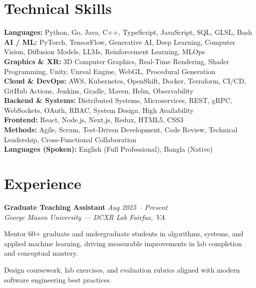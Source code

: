 \documentclass[letterpaper,10pt]{article}
\newcommand{\role}[4]{%
  \textbf{#1} \hfill \textit{#3}\\[-1pt]
  \textit{#2} \hfill \textit{#4}\par\vspace{2pt}
}
\begin{document}
\section*{Technical Skills}
\textbf{Languages:} Python, Go, Java, C++, TypeScript, JavaScript, SQL, GLSL, Bash\\
\textbf{AI / ML:} PyTorch, TensorFlow, Generative AI, Deep Learning, Computer Vision, Diffusion Models, LLMs, Reinforcement Learning, MLOps\\
\textbf{Graphics \& XR:} 3D Computer Graphics, Real-Time Rendering, Shader Programming, Unity, Unreal Engine, WebGL, Procedural Generation\\
\textbf{Cloud \& DevOps:} AWS, Kubernetes, OpenShift, Docker, Terraform, CI/CD, GitHub Actions, Jenkins, Gradle, Maven, Helm, Observability\\
\textbf{Backend \& Systems:} Distributed Systems, Microservices, REST, gRPC, WebSockets, OAuth, RBAC, System Design, High Availability\\
\textbf{Frontend:} React, Node.js, Next.js, Redux, HTML5, CSS3\\
\textbf{Methods:} Agile, Scrum, Test-Driven Development, Code Review, Technical Leadership, Cross-Functional Collaboration\\
\textbf{Languages (Spoken):} English (Full Professional), Bangla (Native)

\section*{Experience}

\role{Graduate Teaching Assistant}{George Mason University --- DCXR Lab}{Aug 2025 -- Present}{Fairfax, VA}
\begin{tightitemize}
  \item Mentor 60+ graduate and undergraduate students in algorithms, systems, and applied machine learning, driving measurable improvements in lab completion and conceptual mastery.
  \item Design coursework, lab exercises, and evaluation rubrics aligned with modern software engineering best practices.
\end{tightitemize}
\end{document}
